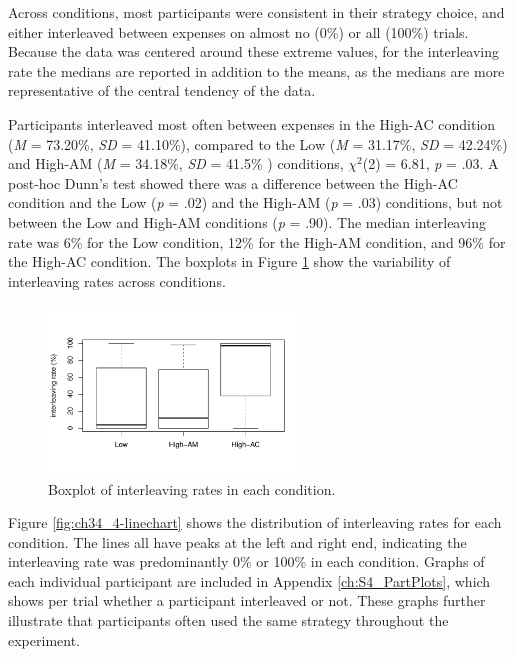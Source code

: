 Across conditions, most participants were consistent in their strategy choice, and either interleaved between expenses on almost no (0\%) or all (100\%) trials. Because the data was centered around these extreme values, for the interleaving rate the medians are reported in addition to the means, as the medians are more representative of the central tendency of the data.


Participants interleaved most often between expenses in the High-AC condition (\textit{M} = 73.20\%, \textit{SD} = 41.10\%), compared to the Low (\textit{M} = 31.17\%, \textit{SD} = 42.24\%) and High-AM (\textit{M} = 34.18\%, \textit{SD} = 41.5\% ) conditions, $\chi^2$(2) = 6.81, \textit{p} = .03. A post-hoc Dunn's test showed there was a difference between the High-AC condition and the Low (\textit{p} = .02) and the High-AM (\textit{p} = .03) conditions, but not between the Low and High-AM conditions (\textit{p} = .90). The median interleaving rate was 6\% for the Low condition, 12\% for the High-AM condition, and 96\% for the High-AC condition. The boxplots in Figure \ref{fig:ch34_4-boxplots} show the variability of interleaving rates across conditions. 

\begin{figure}
 \includegraphics[width=0.6\textwidth]{images/ch34/ch4_4-boxplot.pdf}
\caption[Study 4 boxplot of interleaving rates]{Boxplot of interleaving rates in each condition.}
\label{fig:ch34_4-boxplots}
\end{figure}

Figure \ref{fig:ch34_4-linechart} shows the distribution of interleaving rates for each condition. The lines all have peaks at the left and right end, indicating the interleaving rate was predominantly 0\% or 100\% in each condition. Graphs of each individual participant are included in Appendix \ref{ch:S4_PartPlots}, which shows per trial whether a participant interleaved or not. These graphs further illustrate that participants often used the same strategy throughout the experiment.

